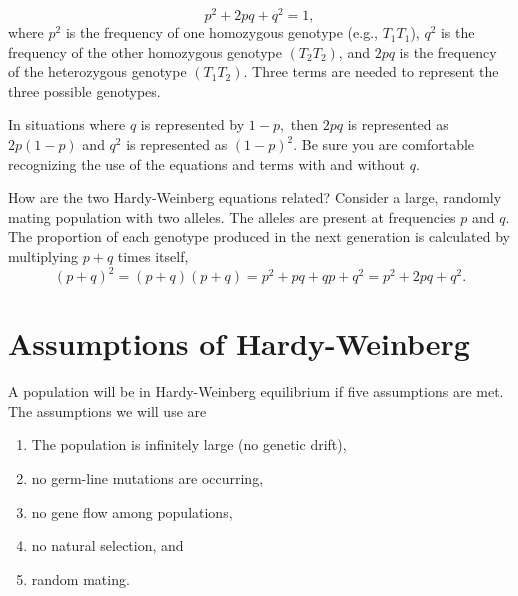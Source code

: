 \documentclass[letterpaper]{tufte-handout}
\begin{document}
\begin{equation*}
p^2 + 2pq+q^2=1,
\end{equation*}
where $p^2$ is the frequency of one homozygous genotype (e.g., $T_1T_1$), $q^2$ is the frequency of the other homozygous genotype $(T_2T_2)$, and $2pq$ is the frequency of the heterozygous genotype $(T_1T_2)$.  Three terms are needed to represent the three possible genotypes. 

In situations where $q$ is represented by $1-p,$ then $2pq$ is represented as $2p(1-p)$ and $q^2$ is represented as $(1-p)^2.$ Be sure you are comfortable recognizing the use of the equations and terms with and without $q$.

How are the two Hardy-Weinberg equations related?  Consider a large, randomly mating population with two alleles.  The alleles are present at frequencies $p$ and $q$.  The proportion of each genotype produced in the next generation is calculated by multiplying $p+q$ times itself,
\begin{equation*}
(p+q)^2=
(p+q)(p+q) =
p^2 + pq + qp + q^2 =
p^2 + 2pq + q^2.
\end{equation*}

\section*{Assumptions of Hardy-Weinberg}

A population will be in Hardy-Weinberg equilibrium if five assumptions are met. The assumptions we will use are

\begin{enumerate}

	\item The population is infinitely large (no genetic drift),

	\item no germ-line mutations are occurring,

	\item no gene flow among populations,

	\item no natural selection, and

	\item random mating.

	
\end{enumerate}
\end{document}
